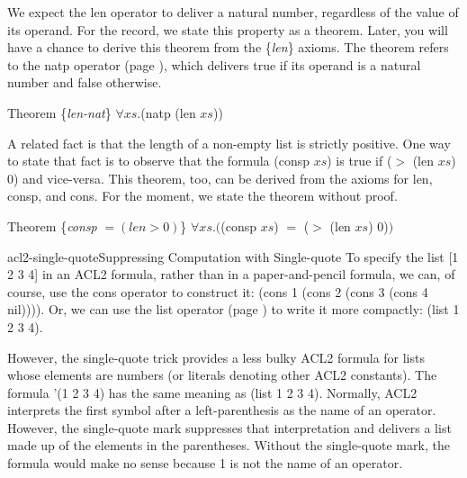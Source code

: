 We expect the \textsf{len} operator to deliver a natural number,
regardless of the value of its operand.
For the record, we state this property as a theorem.
Later, you will have a chance to derive
this theorem from the \{\emph{len}\} axioms.
The theorem refers to the \textsf{natp} operator
(page \pageref{natp-op}),
which delivers true if its operand is a natural number and false otherwise.
\begin{samepage}
\label{len-nat-thm}
\begin{center}
Theorem \{\emph{len-nat}\} $\forall xs.$\textsf{(natp (len $xs$))}
\end{center}
\end{samepage}

A related fact is that the length of a non-empty list is strictly positive.
One way to state that fact is to observe that the formula \textsf{(consp $xs$)} is true
if \textsf{($>$ (len $xs$) 0)} and vice-versa. %
This theorem, too, can be derived from the axioms for
\textsf{len}, \textsf{consp}, and \textsf{cons}.
For the moment, we state the theorem without proof.
\begin{samepage}
\label{consp-len-thm}
\begin{center}
Theorem \{\emph{consp} $= (len > 0)$\} $\forall xs.($\textsf{(consp $xs$)} $=$ \textsf{($>$ (len $xs$) 0)}$)$
\end{center}
\end{samepage}

\begin{aside}{acl2-single-quote}{Suppressing Computation with Single-quote}
To specify the list \textsf{[1 2 3 4]} in an ACL2 formula,
rather than in a paper-and-pencil formula,
we can, of course, use the \textsf{cons} operator to construct it:
\textsf{(cons 1 (cons 2 (cons 3 (cons 4 nil))))}.
Or, we can use the \textsf{list} operator (page \pageref{list-op-informal}) to write it more compactly:
\textsf{(list 1 2 3 4)}.

However, the single-quote trick provides a less bulky ACL2 formula for lists
whose elements are numbers (or literals denoting other ACL2 constants).
The formula
\textsf{'(1 2 3 4)} has the same meaning as \textsf{(list 1 2 3 4)}.
Normally, ACL2 interprets the first symbol after a left-parenthesis
as the name of an operator.
However, the single-quote mark suppresses that interpretation and
delivers a list made up of the elements in the parentheses.
Without the single-quote mark,
the formula would make no sense because 1 is not the name of an
operator.
\end{aside}

